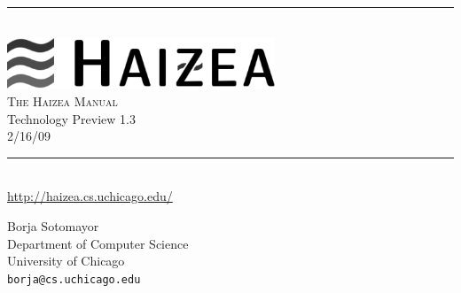 \newcommand{\HRule}{\rule{\linewidth}{0.5mm}}

\begin{titlepage}
 
\begin{center}
 
\HRule \\[0.4cm]
\includegraphics[width=0.6\textwidth]{images/haizea.png}\\[1cm]
\textsc{ \huge The Haizea Manual}\\{\large Technology Preview 1.3}\\{\large 2/16/09}\\[0.4cm]
 
\HRule \\[1.5cm]
\url{http://haizea.cs.uchicago.edu/}

\vfill
 
\begin{flushright} \large
Borja Sotomayor\\
Department of Computer Science\\
University of Chicago\\
\texttt{borja@cs.uchicago.edu}
\end{flushright}
 
\end{center}
 
\end{titlepage}
